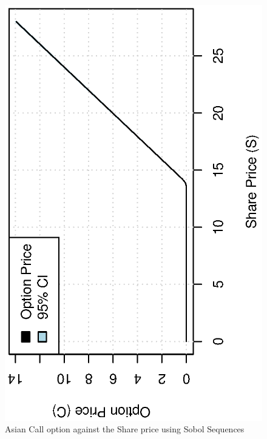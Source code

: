 \documentclass[12pt,a4paper]{article}
\begin{document}
\begin{figure}[!ht]
  \centering
  \includegraphics[scale=0.85,angle=-90]{./images/sobol/option_share.eps}
  \caption{Asian Call option against the Share price using Sobol Sequences}
  \label{fig:option-share-price-sobol}
\end{figure}
\end{document}
